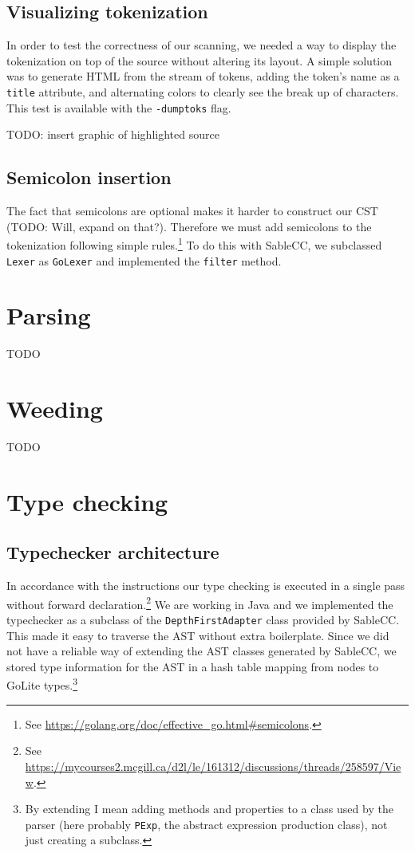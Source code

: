 \documentclass[oneside]{article}
\begin{document}
\subsection{Visualizing tokenization}
In order to test the correctness of our scanning, we needed a way to display the tokenization on top of the source without altering its layout. A simple solution was to generate HTML from the stream of tokens, adding the token's name as a \verb|title| attribute, and alternating colors to clearly see the break up of characters. This test is available with the \verb|-dumptoks| flag.

TODO: insert graphic of highlighted source

\subsection{Semicolon insertion}
The fact that semicolons are optional makes it harder to construct our CST (TODO: Will, expand on that?). Therefore we must add semicolons to the tokenization following simple rules.\footnote{See \url{https://golang.org/doc/effective_go.html\#semicolons}.} To do this with SableCC, we subclassed \verb|Lexer| as \verb|GoLexer| and implemented the \verb|filter| method.

\section{Parsing}

TODO

\section{Weeding}

TODO

\section{Type checking}
\subsection{Typechecker architecture}

In accordance with the instructions our type checking is executed in a single pass without forward declaration.\footnote{See \url{https://mycourses2.mcgill.ca/d2l/le/161312/discussions/threads/258597/View}.} We are working in Java and we implemented the typechecker as a subclass of the \verb|DepthFirstAdapter| class provided by SableCC. This made it easy to traverse the AST without extra boilerplate. Since we did not have a reliable way of extending the AST classes generated by SableCC, we stored type information for the AST in a hash table mapping from nodes to GoLite types.\footnote{By extending I mean adding methods and properties to a class used by the parser (here probably \texttt{PExp}, the abstract expression production class), not just creating a subclass.}
\end{document}
